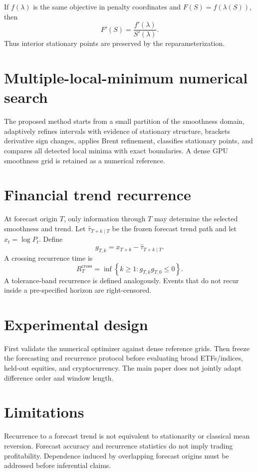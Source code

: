 \documentclass[11pt]{article}
\begin{document}
If $f(\lambda)$ is the same objective in penalty coordinates and
$F(S)=f(\lambda(S))$, then
\[
F'(S)=\frac{f'(\lambda)}{S'(\lambda)}.
\]
Thus interior stationary points are preserved by the reparameterization.

\section{Multiple-local-minimum numerical search}

The proposed method starts from a small partition of the smoothness domain,
adaptively refines intervals with evidence of stationary structure, brackets
derivative sign changes, applies Brent refinement, classifies stationary
points, and compares all detected local minima with exact boundaries. A dense
GPU smoothness grid is retained as a numerical reference.

\section{Financial trend recurrence}

At forecast origin $T$, only information through $T$ may determine the selected
smoothness and trend. Let $\widehat\tau_{T+k\mid T}$ be the frozen forecast
trend path and let $x_t=\log P_t$. Define
\[
g_{T,k}=x_{T+k}-\widehat\tau_{T+k\mid T}.
\]
A crossing recurrence time is
\[
R_T^{\mathrm{cross}}
=
\inf\left\{
k\ge1:g_{T,k}g_{T,0}\le0
\right\}.
\]
A tolerance-band recurrence is defined analogously. Events that do not recur
inside a pre-specified horizon are right-censored.

\section{Experimental design}

First validate the numerical optimizer against dense reference grids. Then
freeze the forecasting and recurrence protocol before evaluating broad
ETFs/indices, held-out equities, and cryptocurrency. The main paper does not
jointly adapt difference order and window length.

\section{Limitations}

Recurrence to a forecast trend is not equivalent to stationarity or classical
mean reversion. Forecast accuracy and recurrence statistics do not imply
trading profitability. Dependence induced by overlapping forecast origins must
be addressed before inferential claims.


\end{document}
